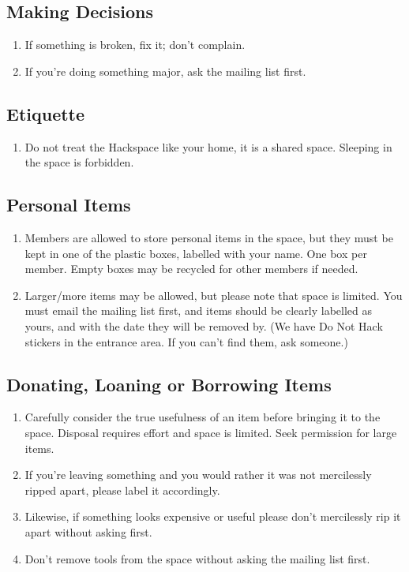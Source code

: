 \documentclass[12pt,a4paper]{book}
\begin{document}
\subsection{Making Decisions}

\begin{enumerate}
	\item If something is broken, fix it; don't complain.
	\item If you're doing something major, ask the mailing list first.
\end{enumerate}

\subsection{Etiquette}

\begin{enumerate}
	\item Do not treat the Hackspace like your home, it is a shared space. Sleeping in the space is forbidden.
\end{enumerate}

\subsection{Personal Items}

\begin{enumerate}
	\item Members are allowed to store personal items in the space, but they must be kept in one of the plastic boxes, labelled with your name. One box per member. Empty boxes may be recycled for other members if needed.
	\item Larger/more items may be allowed, but please note that space is limited. You must email the mailing list first, and items should be clearly labelled as yours, and with the date they will be removed by. (We have Do Not Hack stickers in the entrance area. If you can't find them, ask someone.)
\end{enumerate}

\subsection{Donating, Loaning or Borrowing Items}

\begin{enumerate}
	\item Carefully consider the true usefulness of an item before bringing it to the space. Disposal requires effort and space is limited. Seek permission for large items.
	\item If you're leaving something and you would rather it was not mercilessly ripped apart, please label it accordingly.
	\item Likewise, if something looks expensive or useful please don't mercilessly rip it apart without asking first.
	\item Don't remove tools from the space without asking the mailing list first.
\end{enumerate}
\end{document}

